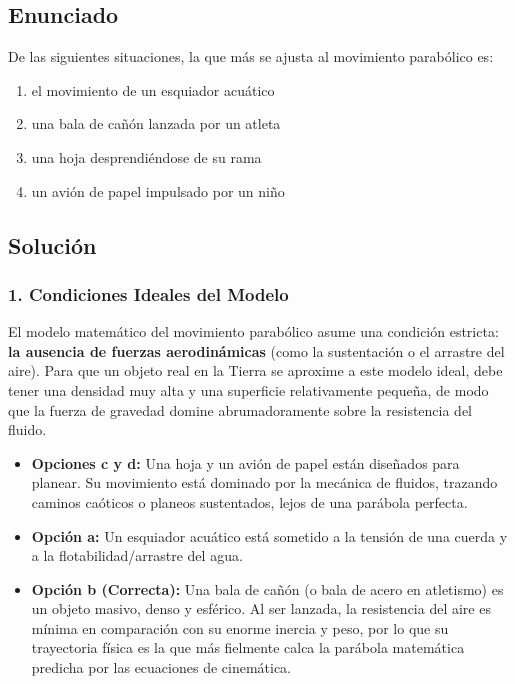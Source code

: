 \documentclass[12pt, a4paper]{article}
\begin{document}
\subsection*{Enunciado}
De las siguientes situaciones, la que más se ajusta al movimiento parabólico es:
\begin{enumerate}[label=\alph*)]
    \item el movimiento de un esquiador acuático
    \item una bala de cañón lanzada por un atleta
    \item una hoja desprendiéndose de su rama
    \item un avión de papel impulsado por un niño
\end{enumerate}

\subsection*{Solución}

\subsubsection*{1. Condiciones Ideales del Modelo}
El modelo matemático del movimiento parabólico asume una condición estricta: \textbf{la ausencia de fuerzas aerodinámicas} (como la sustentación o el arrastre del aire). 
Para que un objeto real en la Tierra se aproxime a este modelo ideal, debe tener una densidad muy alta y una superficie relativamente pequeña, de modo que la fuerza de gravedad domine abrumadoramente sobre la resistencia del fluido.
\begin{itemize}
    \item \textbf{Opciones c y d:} Una hoja y un avión de papel están diseñados para planear. Su movimiento está dominado por la mecánica de fluidos, trazando caminos caóticos o planeos sustentados, lejos de una parábola perfecta.
    \item \textbf{Opción a:} Un esquiador acuático está sometido a la tensión de una cuerda y a la flotabilidad/arrastre del agua.
    \item \textbf{Opción b (Correcta):} Una bala de cañón (o bala de acero en atletismo) es un objeto masivo, denso y esférico. Al ser lanzada, la resistencia del aire es mínima en comparación con su enorme inercia y peso, por lo que su trayectoria física es la que más fielmente calca la parábola matemática predicha por las ecuaciones de cinemática.
\end{itemize}
\end{document}
